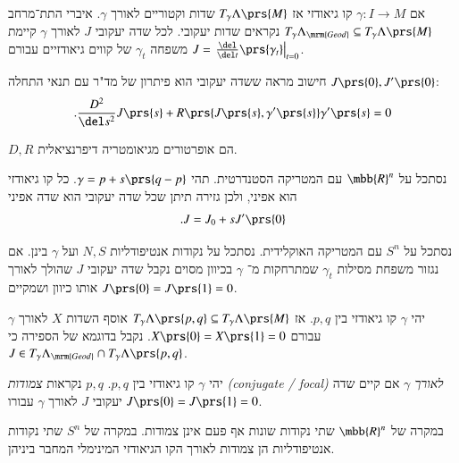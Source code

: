 \documentclass[a4paper,10pt,twoside,openany]{book}
\begin{document}

אם
$\gamma \colon I \to M$
קו גיאודזי אז
$T_\gamma \Lambda\prs{M}$
שדות וקטוריים לאורך
$\gamma$.
איברי התת־מרחב
$T_{\gamma}\Lambda_{\mrm{Geod}} \subseteq T_{\gamma}\Lambda\prs{M}$
נקראים שדות יעקובי.
לכל שדה יעקובי
$J$
לאורך
$\gamma$
קיימת משפחה
$\gamma_t$
של קווים גיאודזיים עבורם
$J = \left. \frac{\del}{\del t} \prs{\gamma_t} \right|_{t=0}$.

חישוב מראה ששדה יעקובי הוא פיתרון של מד"ר עם תנאי התחלה
$J\prs{0}, J'\prs{0}$:
\begin{align*}
\text{.} \frac{D^2}{\del s^2} J\prs{s} + R\prs{J\prs{s}, \gamma'\prs{s}} \gamma'\prs{s} = 0
\end{align*}

\begin{remark}
$D, R$
הם אופרטורים מגיאומטריה דיפרנציאלית.
\end{remark}

\begin{example}
נסתכל על
$\mbb{R}^n$
עם המטריקה הסטנדרטית.
תהי
$\gamma = p + s\prs{q-p}$.
כל קו גיאודזי הוא אפיני, ולכן גזירה תיתן שכל שדה יעקובי הוא שדה אפיני
\[\text{.} J = J_0 + s J'\prs{0}\]
\end{example}

\begin{example}
נסתכל על
$S^n$
עם המטריקה האוקלידית.
נסתכל על נקודות אנטיפודליות
$N,S$
ועל
$\gamma$
בינן.
אם נגזור משפחת מסילות
$\gamma_t$
שמתרחקות מ־%
$\gamma$
בכיוון מסוים נקבל שדה יעקובי
$J$
שהולך לאורך אותו כיוון ושמקיים
$J\prs{0} = J\prs{1} = 0$.
\end{example}

יהי
$\gamma$
קו גיאודזי בין
$p,q$.
אז
$T_{\gamma} \Lambda\prs{p,q} \subseteq T_{\gamma}\Lambda\prs{M}$
אוסף השדות
$X$
לאורך
$\gamma$
עבורם
$X\prs{0} = X\prs{1} = 0$.
נקבל בדוגמא של הספירה כי
$J \in T_\gamma \Lambda_{\mrm{Geod}}\cap T_{\gamma} \Lambda\prs{p,q}$.

\begin{definition}
יהי
$\gamma$
קו גיאודזי בין
$p,q$.
$p,q$
נקראות
\emph{צמודות
\textenglish{(conjugate / focal)}
לאורך
$\gamma$}
אם קיים שדה יעקובי
$J$
לאורך
$\gamma$
עבורו
$J\prs{0} = J\prs{1} = 0$.
\end{definition}

\begin{remark}
במקרה של
$\mbb{R}^n$
שתי נקודות שונות אף פעם אינן צמודות.
במקרה של
$S^n$
שתי נקודות אנטיפודליות הן צמודות לאורך הקו הגיאודזי המינימלי המחבר ביניהן.
\end{remark}
\end{document}
